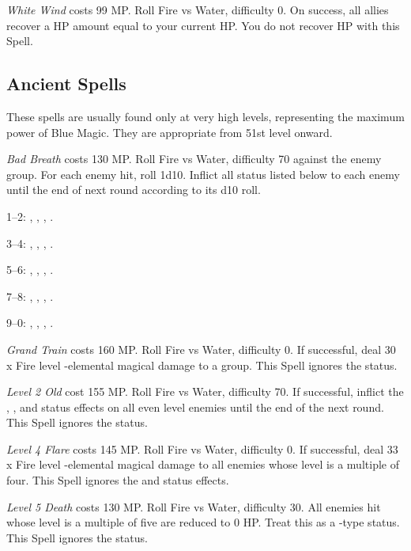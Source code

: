 \begin{multicols}{2}
    \textit{White Wind} costs 99 MP\@. Roll Fire vs Water, difficulty 0. On success, all allies recover a HP amount equal to your current HP\@. You do not recover HP with this Spell.

\subsection{Ancient Spells}\label{subsec:blue-ancient}

	These spells are usually found only at very high levels, representing the maximum power of Blue Magic. They are appropriate from 51st level onward.
    
    \textit{Bad Breath} costs 130 MP\@. Roll Fire vs Water, difficulty 70 against the enemy group. For each enemy hit, roll 1d10. Inflict all status listed below to each enemy until the end of next round according to its d10 roll.

1--2: , , , .

3--4: , , , .

5--6: , , , .

7--8: , , , .

9--0: , , , .

    \textit{Grand Train} costs 160 MP\@. Roll Fire vs Water, difficulty 0. If successful, deal 30 x Fire level -elemental magical damage to a group. This Spell ignores the  status.
    
    \textit{Level 2 Old} cost 155 MP\@. Roll Fire vs Water, difficulty 70. If successful, inflict the , ,  and  status effects on all even level enemies until the end of the next round. This Spell ignores the  status.
    
    \textit{Level 4 Flare} costs 145 MP\@. Roll Fire vs Water, difficulty 0. If successful, deal 33 x Fire level -elemental magical damage to all enemies whose level is a multiple of four. This Spell ignores the  and  status effects.
    
    \textit{Level 5 Death} costs 130 MP\@. Roll Fire vs Water, difficulty 30. All enemies hit whose level is a multiple of five are reduced to 0 HP\@. Treat this as a -type status. This Spell ignores the  status.
    

\end{multicols}
